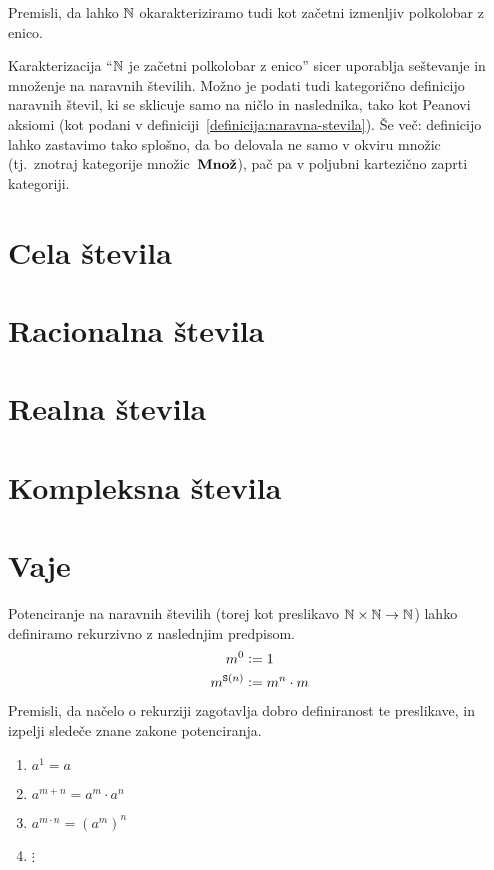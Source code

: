 \begin{naloga}
Premisli, da lahko $\mathbb{N}$ okarakteriziramo tudi kot začetni izmenljiv polkolobar z enico.
\end{naloga}

Karakterizacija ``$\mathbb{N}$ je začetni polkolobar z enico'' sicer uporablja seštevanje in množenje na naravnih številih. Možno je podati tudi kategorično definicijo naravnih števil, ki se sklicuje samo na ničlo in naslednika, tako kot Peanovi aksiomi (kot podani v definiciji~\ref{definicija:naravna-stevila}). Še več: definicijo lahko zastavimo tako splošno, da bo delovala ne samo v okviru množic (tj.~znotraj kategorije množic~$\mathbf{Mno\check{z}}$), pač pa v poljubni kartezično zaprti kategoriji.


 


\section{Cela števila}
\section{Racionalna števila}
\section{Realna števila}
\section{Kompleksna števila}



\section{Vaje}

\begin{vaja}
Potenciranje na naravnih številih (torej kot preslikavo $\mathbb{N} \times \mathbb{N} \to \mathbb{N}$) lahko definiramo rekurzivno z naslednjim predpisom.
\begin{align*}
m^0 &\mathrel{\mathop:}= 1 \\
m^{\mathtt{S}(n)} &\mathrel{\mathop:}= m^n \cdot m
\end{align*}
Premisli, da načelo o rekurziji zagotavlja dobro definiranost te preslikave, in izpelji sledeče znane zakone potenciranja.
\begin{enumerate}
\item
$a^1 = a$
\item
$a^{m + n} = a^m \cdot a^n$
\item
$a^{m \cdot n} = (a^m)^n$
\item
$\vdots$
\end{enumerate}
\end{vaja}


